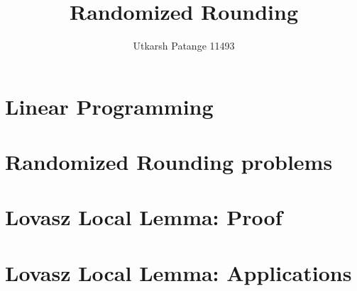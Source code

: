 \documentclass[a4paper,10pt]{report}
\author{Utkarsh Patange 11493}
\title{Randomized Rounding}
\begin{document}
\maketitle
\tableofcontents
\chapter{Linear Programming}

\chapter{Randomized Rounding problems}

\chapter{Lovasz Local Lemma: Proof}

\chapter{Lovasz Local Lemma: Applications}

 

\end{document}

